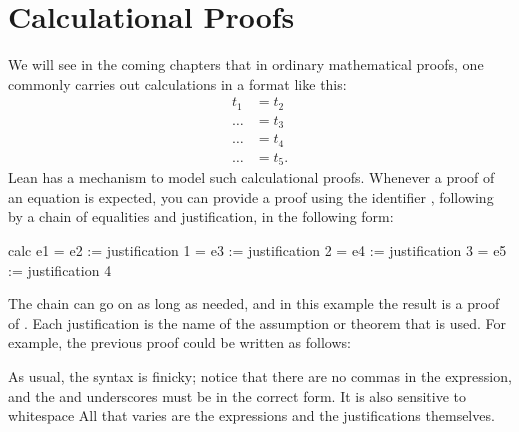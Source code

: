 \documentclass[letterpaper,10pt,english]{sphinxmanual}
\begin{document}
\section{Calculational Proofs}
\label{\detokenize{first_order_logic_in_lean:calculational-proofs}}
\sphinxAtStartPar
We will see in the coming chapters that in ordinary mathematical proofs, one commonly carries out calculations in a format like this:
\begin{equation*}
\begin{split}t_1 &= t_2 \\
 \ldots & = t_3 \\
 \ldots &= t_4 \\
 \ldots &= t_5.\end{split}
\end{equation*}
\sphinxAtStartPar
Lean has a mechanism to model such calculational proofs. Whenever a proof of an equation is expected, you can provide a proof using the identifier , following by a chain of equalities and justification, in the following form:

\begin{sphinxVerbatim}[commandchars=\\\{\}]
calc
  e1 = e2 := justification 1
   \PYGZus{} = e3 := justification 2
   \PYGZus{} = e4 := justification 3
   \PYGZus{} = e5 := justification 4
\end{sphinxVerbatim}

\sphinxAtStartPar
The chain can go on as long as needed, and in this example the result is a proof of . Each justification is the name of the assumption or theorem that is used. For example, the previous proof could be written as follows:

\begin{sphinxVerbatim}[commandchars=\\\{\}]
             
      
      
       
      
\end{sphinxVerbatim}

\sphinxAtStartPar
As usual, the syntax is finicky; notice that there are no commas in the
 expression,
and the \sphinxcode{\sphinxupquote{:=}} and underscores must be in the correct form.
It is also sensitive to whitespace
All that varies are the expressions 
and the justifications themselves.
\end{document}
